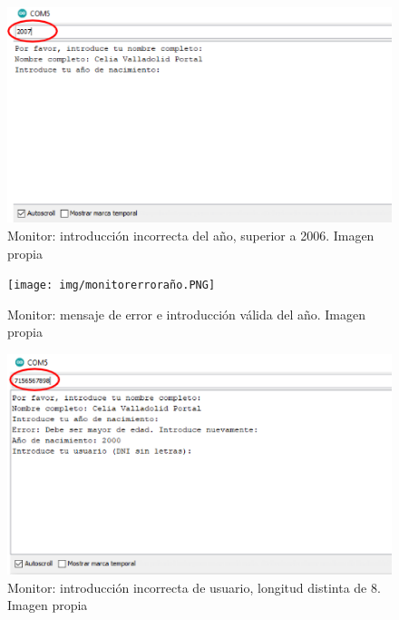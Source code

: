  \begin{figure}[h]
    \centering
    \includegraphics[width=1.1\textwidth]{img/monitorañomal.PNG}
    \caption{Monitor: introducción incorrecta del año, superior a 2006. Imagen propia }
    \label{fig:monitorAÑOMAL}
\end{figure}

 \begin{figure}[h]
    \centering
    \texttt{[image: img/monitorerroraño.PNG]}
    \caption{Monitor: mensaje de error e introducción válida del año. Imagen propia }
    \label{fig:monitorERRORAÑO}
\end{figure}

 \begin{figure}[h]
    \centering
    \includegraphics[width=1.1\textwidth]{img/monitorusuariomal.PNG}
    \caption{Monitor: introducción incorrecta de usuario, longitud distinta de 8. Imagen propia }
    \label{fig:monitorUSUARIOMAL}
\end{figure}

